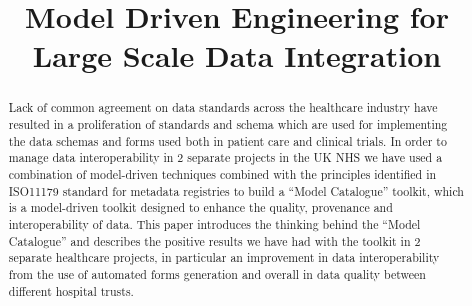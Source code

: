 \documentclass[conference]{IEEEtran}
\begin{document}
 


\title{Model Driven Engineering for \\ Large Scale Data Integration}

\vskip 4mm 

\author{
}
\ifpdf
\graphicspath{{ASEFigs/}}
\fi

\maketitle

\begin{abstract}
Lack of common agreement on data standards across the healthcare industry have resulted in a proliferation of standards and schema which are used for implementing the data schemas and forms used both in patient care and clinical trials. In order to manage data interoperability in 2 separate projects in the UK NHS we have used a combination of model-driven techniques combined with the principles identified in ISO11179 standard for metadata registries to build a “Model Catalogue” toolkit, which is a model-driven toolkit designed to enhance the quality, provenance and interoperability of data. This paper introduces the thinking behind the “Model Catalogue” and describes the positive results we have had with the toolkit in 2 separate healthcare projects, in particular an improvement in data interoperability from the use of automated forms generation and overall in data quality between different hospital trusts.

\end{abstract}

\vskip 14mm

\noindent






 


\newpage




\end{document}
